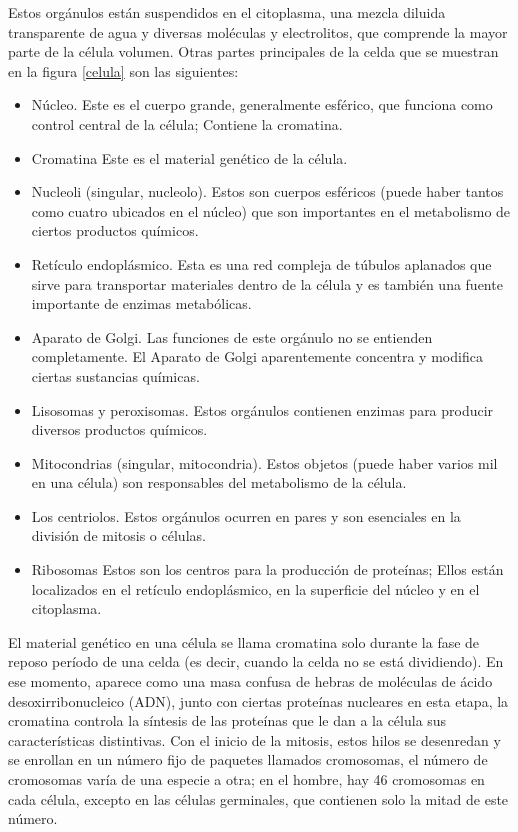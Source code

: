 \documentclass[]{article}
\begin{document}
Estos orgánulos están suspendidos en el citoplasma, una mezcla diluida transparente de agua y diversas moléculas y electrolitos, que comprende la mayor parte de la célula volumen. Otras partes principales de la celda que se muestran en la figura \ref{celula}  son las siguientes:\\

\begin{itemize}
	\item Núcleo. Este es el cuerpo grande, generalmente esférico, que funciona como control central de la célula; Contiene la cromatina.
	 \item Cromatina Este es el material genético de la célula.
	\item Nucleoli (singular, nucleolo). Estos son cuerpos esféricos (puede haber tantos como cuatro ubicados en el núcleo) que son importantes en el metabolismo de ciertos productos químicos.
   \item Retículo endoplásmico. Esta es una red compleja de túbulos aplanados que sirve para transportar materiales dentro de la célula y es también una fuente importante de enzimas metabólicas.
   \item Aparato de Golgi. Las funciones de este orgánulo no se entienden completamente. El Aparato de Golgi aparentemente concentra y modifica ciertas sustancias químicas.
   \item Lisosomas y peroxisomas. Estos orgánulos contienen enzimas para producir diversos productos químicos.
   \item Mitocondrias (singular, mitocondria). Estos objetos (puede haber varios mil en una célula) son responsables del metabolismo de la célula.
   \item Los centriolos. Estos orgánulos ocurren en pares y son esenciales en la división de mitosis o células.
   \item Ribosomas Estos son los centros para la producción de proteínas; Ellos están localizados en el retículo endoplásmico, en la superficie del núcleo y en el citoplasma.
\end{itemize}

El material genético en una célula se llama cromatina solo durante la fase de reposo período de una celda (es decir, cuando la celda no se está dividiendo). En ese momento, aparece como una masa confusa de hebras de moléculas de ácido desoxirribonucleico (ADN), junto con ciertas proteínas nucleares en esta etapa, la cromatina controla la síntesis de las proteínas que le dan a la célula sus características distintivas. Con el inicio de la mitosis, estos hilos se desenredan y se enrollan en un número fijo de paquetes llamados cromosomas, el número de cromosomas varía de una especie a otra; en el hombre, hay 46 cromosomas en cada célula, excepto en las células germinales, que contienen solo la mitad de este número.\\
\end{document}
